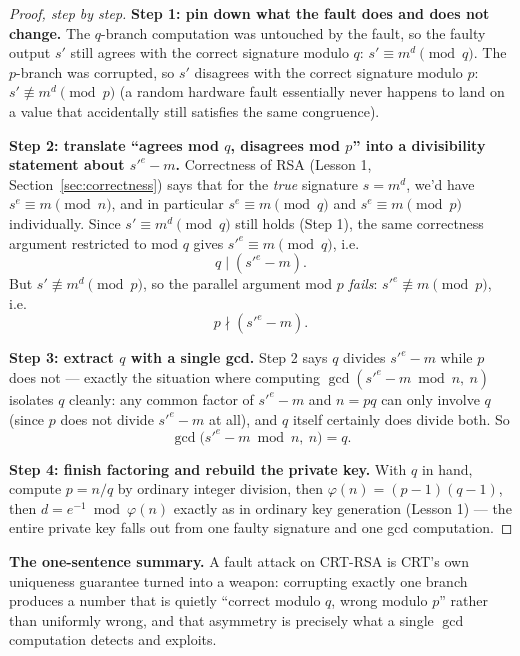 \begin{proof}[Proof, step by step]
\textbf{Step 1: pin down what the fault does and does not change.} The $q$-branch computation was untouched by the fault, so the faulty output $s'$ still agrees with the correct signature modulo $q$: $s' \equiv m^d \pmod q$. The $p$-branch was corrupted, so $s'$ disagrees with the correct signature modulo $p$: $s' \not\equiv m^d \pmod p$ (a random hardware fault essentially never happens to land on a value that accidentally still satisfies the same congruence).

\textbf{Step 2: translate ``agrees mod $q$, disagrees mod $p$'' into a divisibility statement about $s'^e - m$.} Correctness of RSA (Lesson 1, Section~\ref{sec:correctness}) says that for the \emph{true} signature $s=m^d$, we'd have $s^e\equiv m\pmod n$, and in particular $s^e\equiv m\pmod q$ and $s^e\equiv m\pmod p$ individually. Since $s'\equiv m^d\pmod q$ still holds (Step 1), the same correctness argument restricted to mod $q$ gives $s'^e\equiv m\pmod q$, i.e.
\[
q \mid (s'^e - m).
\]
But $s'\not\equiv m^d\pmod p$, so the parallel argument mod $p$ \emph{fails}: $s'^e\not\equiv m\pmod p$, i.e.
\[
p \nmid (s'^e - m).
\]

\textbf{Step 3: extract $q$ with a single gcd.} Step 2 says $q$ divides $s'^e-m$ while $p$ does not — exactly the situation where computing $\gcd(s'^e-m\bmod n,\ n)$ isolates $q$ cleanly: any common factor of $s'^e-m$ and $n=pq$ can only involve $q$ (since $p$ does not divide $s'^e-m$ at all), and $q$ itself certainly does divide both. So
\[
\gcd\big(s'^e - m \bmod n,\ n\big) = q.
\]

\textbf{Step 4: finish factoring and rebuild the private key.} With $q$ in hand, compute $p=n/q$ by ordinary integer division, then $\varphi(n)=(p-1)(q-1)$, then $d=e^{-1}\bmod\varphi(n)$ exactly as in ordinary key generation (Lesson 1) — the entire private key falls out from one faulty signature and one gcd computation.
\end{proof}

\medskip\noindent\textbf{The one-sentence summary.} A fault attack on CRT-RSA is CRT's own uniqueness guarantee turned into a weapon: corrupting exactly one branch produces a number that is quietly ``correct modulo $q$, wrong modulo $p$'' rather than uniformly wrong, and that asymmetry is precisely what a single $\gcd$ computation detects and exploits.

